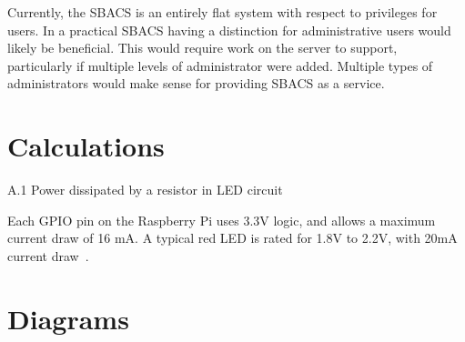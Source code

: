 \documentclass[12pt]{report}
\begin{document}
Currently, the SBACS is an entirely flat system with respect to privileges for users. In a practical SBACS having a
distinction for administrative users would likely be beneficial. This would require work on the server to support,
particularly if multiple levels of administrator were added. Multiple types of administrators would make sense for
providing SBACS as a service.


\printbibliography


\appendix


\chapter{Calculations} \label{appendix:calculations}

A.1 Power dissipated by a resistor in LED circuit

Each GPIO pin on the Raspberry Pi uses 3.3V logic, and allows a maximum current draw of 16 mA. A typical red LED is 
rated for 1.8V to 2.2V, with 20mA current draw~\autocite{REDLED}.


\chapter{Diagrams} \label{appendix:diagrams}
\end{document}
